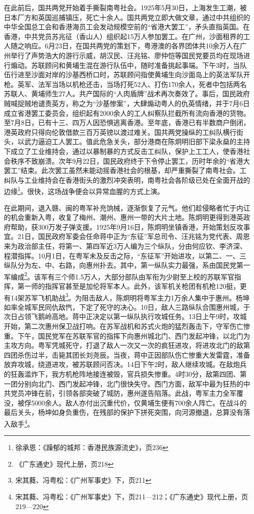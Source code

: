 在此前后，国共两党开始着手撕裂南粤社会。1925年5月30日，上海发生工潮，被日本厂方和英国巡捕镇压，死亡十余人。国共两党立即大做文章，通过中共组织的中华全国总工会和香港海员工会发动规模空前的“省港大罢工”，矛头直指英国。在香港，中共党员苏兆征（香山人）组织起15万人参加罢工。在广州，沙面租界的工人随之响应。6月23日，在国共两党的策划下，粤港澳的各界团体共10余万人在广州举行了声势浩大的游行示威，胡汉民、汪兆铭、廖仲恺等国民党要员均在现场进行煽动。苏联顾问和黄埔生混在游行队伍中，随时准备挑起事端。下午3时，当队伍行进至沙面对岸的沙基西桥口时，苏联顾问指使黄埔生向沙面岛上的英法军队开枪。英军、法军当场以机枪还击，当场打死52人、打伤170余人，死者中包括两名苏联人、黄埔师生27人。共产国际的“人肉盾牌”战术再次奏效了。事后，国民政府贼喊捉贼地谴责英方，称之为“沙基惨案”，大肆煽动粤人的仇英情绪，并于7月6日成立省港罢工委员会，组织起有2000余人的工人纠察队拦截所有流向香港的货物。至7月8日，已有十三、四万人因恐惧逃离香港。至年底，香港已有半数商户倒闭，港英政府只得向伦敦借款三百万英镑以渡过难关。国共两党操纵的工纠队横行街头，以武力逼迫工人罢工。值此危急关头，部分港商在陈炯明旧部下梁永燊的主持下成立了工业维持会，通过以暴制暴的方式反击工纠队，保护上工工人，使香港社会秩序不致崩溃。次年9月22日，国民政府终于下令停止罢工，历时年余的“省港大罢工”结束。此次罢工虽然未能动摇香港社会的根基，却严重撕裂了南粤社会。工纠队与工业维持会在香港街头的激烈冲突表明，南粤社会各阶级已处在全面开战的边缘\footnote{徐承恩：《躁郁的城邦：香港民族源流史》，页236}。很快，这场战争便会以异常血腥的方式上演。

在此期间，退入赣、闽的粤军补充饷械，逐渐恢复了元气。他们趁侵略者忙于内讧的机会重新入粤，收复了梅州、潮州、惠州一带的大片土地。陈炯明更得到港英政府帮助，获300万发子弹支援。1925年9月16日，陈炯明坐镇香港，开始策划反攻事宜。21日，国民政府军委会任命蒋中正为“东征”军总司令、汪兆铭为党代表、周恩来为政治部主任，将第一、第四军近3万人编为三个纵队，分由何应钦、李济深、程潜指挥。10月1日，在粤军未及反击之际，“东征军”开始进攻，以第二、一、三纵队分为左、中、右路，向惠州扑去。其中，第一纵队实力最强，系由国民党第一军编成\footnote{《广东通史》现代上册，页218}。该军有三个师1.5万人，大部分部队由军衔为少尉至上校的苏联军官指挥，第一师的指挥官甚至是加伦将军本人。此外，该军机关枪团有机枪120挺，更有14架苏军飞机助战\footnote{宋其蕤、冯粤松：《广州军事史》下，页211}。为阻击敌人，陈炯明将粤军主力1万余人集中于惠州。杨坤如率全城军民同仇敌忾，下定了死守的决心。10日，敌人三路纵队合围惠州城，于次日占领飞鹅岭高地。蒋中正决定以第一纵队执行攻城任务。13日上午9时，攻城开始，第二次惠州保卫战打响。在苏军战机和苏式火炮的猛烈轰击下，守军伤亡惨重。下午，国民党军在苏联军官的指挥下向惠州城北门、西门发起冲锋，以北门为主攻方向。粤军凭城死守，打退了敌人一次又一次的疯狂进攻，将进攻北门的敌第四团杀伤过半，击毙其团长刘尧辰。当夜，蒋中正因部队伤亡惨重大发雷霆，准备放弃攻城，绕道进攻，被苏联顾问否决。14日下午2时，敌人继续攻城。在敌炮兵的狂轰滥炸下，我方机枪阵地接连被毁，官兵损失惨重。4时30分，敌第四团、第一团分别向北门、西门发起冲锋，北门很快失守。西门方面，敌军中最为狂热的中共党员冲锋在前，引领各部突破了城防，惠州遂告陷落。此战，粤军主力全军覆没，被俘5000余人。敌人亦付出沉重代价，仅黄埔生便有700余人阵亡。在战斗的最后关头，杨坤如身负重伤，在残部的保护下拼死突围，向河源撤退，总算没有落入敌手\footnote{宋其蕤、冯粤松：《广州军事史》下，页211—212；《广东通史》现代上册，页219—220}。 

